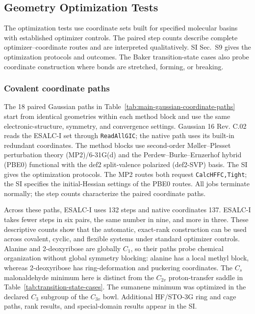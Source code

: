 \documentclass[journal=jctcce,manuscript=article,layout=traditional]{achemso}
\theoremstyle{definition}
\begin{document}
\subsection{Geometry Optimization Tests}
\label{sec:optimization-tests}

{The optimization tests use coordinate sets built for specified
molecular basins with established optimizer controls. The paired step counts
describe complete optimizer--coordinate routes and are interpreted
qualitatively. SI Sec.~S9 gives the optimization protocols and outcomes.
The Baker transition-state cases also probe coordinate construction where
bonds are stretched, forming, or breaking.}

\subsubsection{{Covalent coordinate paths}}
\label{sec:covalent-minima}

{The 18 paired Gaussian paths in
Table~\ref{tab:main-gaussian-coordinate-paths} start from identical
geometries within each method block and use the same electronic-structure,
symmetry, and convergence settings.  Gaussian 16 Rev. C.02 reads the ESALC-I set through \texttt{ReadAllGIC}; the native path uses its built-in redundant coordinates.\cite{PulayFogarasi1992,Peng1996Redundant,BakkenHelgaker2002}
The method blocks use second-order M\o ller--Plesset perturbation theory
(MP2)/6-31G(d)\cite{HariharanPople1973Polarization} and the Perdew--Burke--Ernzerhof hybrid (PBE0) functional\cite{AdamoBarone1999PBE0} with the def2 split-valence
polarized (def2-SVP) basis.\cite{WeigendAhlrichs2005Def2} The SI gives the optimization protocols.  The MP2 routes both request \texttt{CalcHFFC,Tight}; the SI specifies the initial-Hessian settings of the PBE0 routes.  All jobs terminate normally; the step counts characterize the paired coordinate paths.}

{Across these paths, ESALC-I uses 132 steps and native
coordinates 137.  ESALC-I takes fewer steps in six pairs, the same number in
nine, and more in three.  These descriptive counts show that the automatic,
exact-rank construction can be used across covalent, cyclic, and flexible
systems under standard optimizer controls.  Alanine and 2-deoxyribose are globally
\(C_1\), so their paths probe chemical organization without global symmetry
blocking: alanine has a local methyl block, whereas 2-deoxyribose has ring-deformation
and puckering coordinates.  The \(C_s\) malonaldehyde minimum here is distinct
from the \(C_{2v}\) proton-transfer saddle in
Table~\ref{tab:transition-state-cases}.  The sumanene minimum was optimized
in the declared \(C_3\) subgroup of the \(C_{3v}\) bowl.  Additional HF/STO-3G ring and cage paths, rank
results, and special-domain results appear in the SI.}
\end{document}

